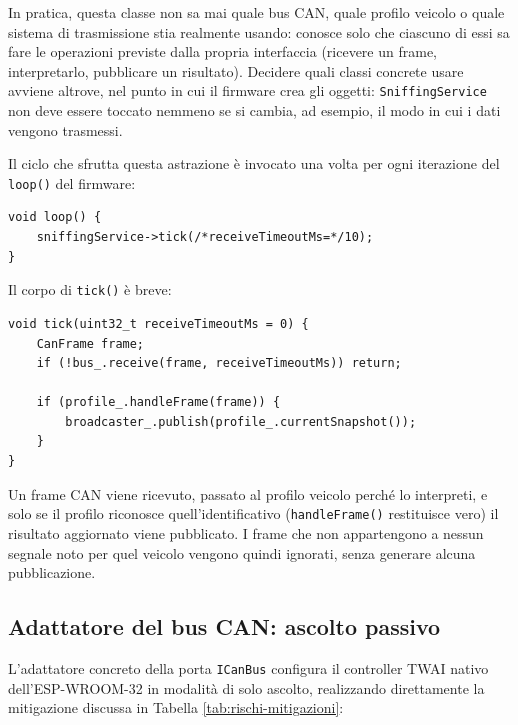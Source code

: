In pratica, questa classe non sa mai quale bus CAN, quale profilo veicolo o
quale sistema di trasmissione stia realmente usando: conosce solo che
ciascuno di essi sa fare le operazioni previste dalla propria interfaccia
(ricevere un frame, interpretarlo, pubblicare un risultato). Decidere quali
classi concrete usare avviene altrove, nel punto in cui il firmware crea gli
oggetti: \texttt{SniffingService} non deve essere toccato nemmeno se si
cambia, ad esempio, il modo in cui i dati vengono trasmessi.

Il ciclo che sfrutta questa astrazione è invocato una volta per ogni
iterazione del \texttt{loop()} del firmware:

\begin{listing}[H]
\begin{verbatim}
void loop() {
    sniffingService->tick(/*receiveTimeoutMs=*/10);
}
\end{verbatim}
\caption{Punto di chiamata del ciclo di orchestrazione}
\label{listing:sniffer-loop}
\end{listing}

Il corpo di \texttt{tick()} è breve:

\begin{listing}[H]
\begin{verbatim}
void tick(uint32_t receiveTimeoutMs = 0) {
    CanFrame frame;
    if (!bus_.receive(frame, receiveTimeoutMs)) return;

    if (profile_.handleFrame(frame)) {
        broadcaster_.publish(profile_.currentSnapshot());
    }
}
\end{verbatim}
\caption{Ciclo di orchestrazione del caso d'uso}
\label{listing:sniffer-tick}
\end{listing}

Un frame CAN viene ricevuto, passato al profilo veicolo perché lo interpreti,
e solo se il profilo riconosce quell'identificativo (\texttt{handleFrame()}
restituisce vero) il risultato aggiornato viene pubblicato. I frame che non
appartengono a nessun segnale noto per quel veicolo vengono quindi ignorati,
senza generare alcuna pubblicazione.

\subsection{Adattatore del bus CAN: ascolto passivo}
L'adattatore concreto della porta \texttt{ICanBus} configura il controller
TWAI nativo dell'ESP-WROOM-32 in modalità di solo ascolto, realizzando
direttamente la mitigazione discussa in
Tabella \ref{tab:rischi-mitigazioni}:

